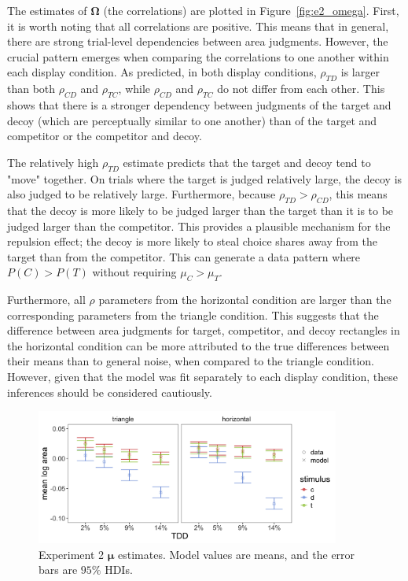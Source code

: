 The estimates of $\boldsymbol{\Omega}$ (the correlations) are plotted in Figure~\ref{fig:e2_omega}. First, it is worth noting that all correlations are positive. This means that in general, there are strong trial-level dependencies between area judgments. However, the crucial pattern emerges when comparing the correlations to one another within each display condition. As predicted, in both display conditions, $\rho_{TD}$ is larger than both $\rho_{CD}$ and $\rho_{TC}$, while $\rho_{CD}$ and $\rho_{TC}$ do not differ from each other. This shows that there is a stronger dependency between judgments of the target and decoy (which are perceptually similar to one another) than of the target and competitor or the competitor and decoy.  

The relatively high $\rho_{TD}$ estimate predicts that the target and decoy tend to "move" together. On trials where the target is judged relatively large, the decoy is also judged to be relatively large. Furthermore, because $\rho_{TD}>\rho_{CD}$, this means that the decoy is more likely to be judged larger than the target than it is to be judged larger than the competitor. This provides a plausible mechanism for the repulsion effect; the decoy is more likely to steal choice shares away from the target than from the competitor. This can generate a data pattern where $P(C)>P(T)$ without requiring $\mu_{C}>\mu_{T}$. 

Furthermore, all $\rho$ parameters from the horizontal condition are larger than the corresponding parameters from the triangle condition. This suggests that the difference between area judgments for target, competitor, and decoy rectangles in the horizontal condition can be more attributed to the true differences between their means than to general noise, when compared to the triangle condition. However, given that the model was fit separately to each display condition, these inferences should be considered cautiously.

\begin{figure}
   \includegraphics[width=100mm]{figures/bayes_circle_area_mu_sigma_constant_comp_effect_model_v_data_collapsed.jpeg}
   \caption{Experiment 2 $\boldsymbol{\mu}$ estimates. Model values are means, and the error bars are $95\%$ HDIs.}
   \label{fig:e2mu}
\end{figure}

